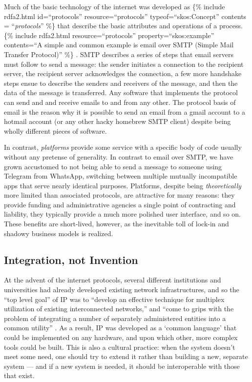 \documentclass[notoc]{tufte-book}
\begin{document}
Much of the basic technology of the internet was developed as \{\%
include rdfa2.html id=``protocols'' resource=``protocols''
typeof=``skos:Concept'' contents = ``\emph{protocols}'' \%\} that
describe the basic attributes and operations of a process. \{\% include
rdfa2.html resource=``protocols'' property=``skos:example'' contents=``A
simple and common example is email over SMTP (Simple Mail Transfer
Protocol)'' \%\} \citep{Rfc5321SimpleMail} . SMTP describes a
series of steps that email servers must follow to send a message: the
sender initiates a connection to the recipient server, the recipient
server acknowledges the connection, a few more handshake steps ensue to
describe the senders and receivers of the message, and then the data of
the message is transferred. Any software that implements the protocol
can send and and receive emails to and from any other. The protocol
basis of email is the reason why it is possible to send an email from a
gmail account to a hotmail account (or any other hacky homebrew SMTP
client) despite being wholly different pieces of software.

In contrast, \emph{platforms} provide some service with a specific body
of code usually without any pretense of generality. In contrast to email
over SMTP, we have grown accustomed to not being able to send a message
to someone using Telegram from WhatsApp, switching between multiple
mutually incompatible apps that serve nearly identical purposes.
Platforms, despite being \emph{theoretically} more limited than
associated protocols, are attractive for many reasons: they provide
funding and administrative agencies a single point of contracting and
liability, they typically provide a much more polished user interface,
and so on. These benefits are short-lived, however, as the inevitable
toll of lock-in and shadowy business models is realized.


\subsection{Integration, not
Invention}

At the advent of the internet protocols, several different institutions
and universities had already developed existing network infrastructures,
and so the ``top level goal'' of IP was to ``develop an effective
technique for multiplex utilization of existing interconnected
networks,'' and ``come to grips with the problem of integrating a number
of separately administered entities into a common utility'' \citep{clarkDesignPhilosophyDARPA1988} . As a result, IP was developed as a
`common language' that could be implemented on any hardware, and upon
which other, more complex tools could be built. This is also a cultural
practice: when the system doesn't meet some need, one should try to
extend it rather than building a new, separate system --- and if a new
system is needed, it should be interoperable with those that exist.
\end{document}
